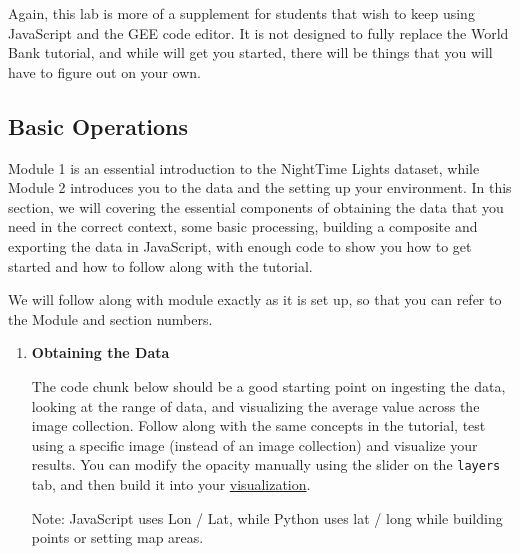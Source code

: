 \documentclass[
]{article}
\begin{document}
Again, this lab is more of a supplement for students that wish to keep using JavaScript and the GEE code editor. It is not designed to fully replace the World Bank tutorial, and while will get you started, there will be things that you will have to figure out on your own.

\hypertarget{basic-operations}{%
\subsection{Basic Operations}\label{basic-operations}}

Module 1 is an essential introduction to the NightTime Lights dataset, while Module 2 introduces you to the data and the setting up your environment. In this section, we will covering the essential components of obtaining the data that you need in the correct context, some basic processing, building a composite and exporting the data in JavaScript, with enough code to show you how to get started and how to follow along with the tutorial.

We will follow along with module exactly as it is set up, so that you can refer to the Module and section numbers.

\begin{enumerate}
\def\labelenumi{\arabic{enumi}.}
\item
  \textbf{Obtaining the Data}

  The code chunk below should be a good starting point on ingesting the data, looking at the range of data, and visualizing the average value across the image collection. Follow along with the same concepts in the tutorial, test using a specific image (instead of an image collection) and visualize your results. You can modify the opacity manually using the slider on the \texttt{layers} tab, and then build it into your \href{https://developers.google.com/earth-engine/guides/image_visualization?hl=en\#code-editor-javascript}{visualization}.

  Note: JavaScript uses Lon / Lat, while Python uses lat / long while building points or setting map areas.
\end{enumerate}
\end{document}
